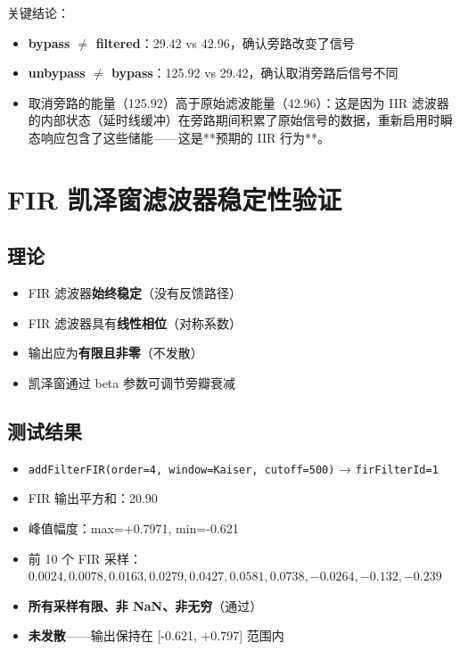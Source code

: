 ﻿\documentclass[12pt,a4paper,oneside]{ctexbook}
\begin{document}
关键结论：
\begin{itemize}
    \item \textbf{bypass $\neq$ filtered}：29.42 vs 42.96，确认旁路改变了信号
    \item \textbf{unbypass $\neq$ bypass}：125.92 vs 29.42，确认取消旁路后信号不同
    \item 取消旁路的能量（125.92）高于原始滤波能量（42.96）：这是因为 IIR 滤波器的内部状态（延时线缓冲）在旁路期间积累了原始信号的数据，重新启用时瞬态响应包含了这些储能——这是**预期的 IIR 行为**。
\end{itemize}

\section{FIR 凯泽窗滤波器稳定性验证}

\subsection{理论}

\begin{itemize}
    \item FIR 滤波器\textbf{始终稳定}（没有反馈路径）
    \item FIR 滤波器具有\textbf{线性相位}（对称系数）
    \item 输出应为\textbf{有限且非零}（不发散）
    \item 凯泽窗通过 beta 参数可调节旁瓣衰减
\end{itemize}

\subsection{测试结果}

\begin{itemize}
    \item \texttt{addFilterFIR(order=4, window=Kaiser, cutoff=500)} → \texttt{firFilterId=1}
    \item FIR 输出平方和：20.90
    \item 峰值幅度：max=+0.7971, min=-0.621
    \item 前 10 个 FIR 采样：\(0.0024, 0.0078, 0.0163, 0.0279, 0.0427, 0.0581, 0.0738, -0.0264, -0.132, -0.239\)
    \item \textbf{所有采样有限、非 NaN、非无穷}（通过）
    \item \textbf{未发散}——输出保持在 [-0.621, +0.797] 范围内
\end{itemize}
\end{document}
